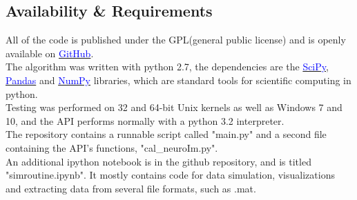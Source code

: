 \documentclass[titlepage]{article}
\begin{document}
\subsection{Availability \& Requirements}
All of the code is published under the GPL(general public license) and is openly available on \href{https://github.com/zmoldir/cal_neuroim}{\textcolor{blue}{GitHub}}\cite{noauthor_gnu_2007}.\\
The algorithm was written with python 2.7, the dependencies are the \href{https://www.scipy.org/}{\textcolor{blue}{SciPy}}\cite{oliphant_python_2007},  \href{http://pandas.pydata.org/}{\textcolor{blue}{Pandas}}\cite{noauthor_pandas:_nodate} and \href{http://www.numpy.org/}{\textcolor{blue}{NumPy}}\cite{walt_numpy_2011} libraries, which are standard tools for scientific computing in python.\\
Testing was performed on 32 and 64-bit Unix kernels as well as Windows 7 and 10, and the API performs normally with a python 3.2 interpreter. \\
The repository contains a runnable script called "main.py" and a second file containing the API's functions, "cal\_neuroIm.py".\\
An additional ipython notebook is in the github repository, and is
titled "simroutine.ipynb". It mostly contains code for data simulation, visualizations and extracting data from several file formats, such as .mat.\\
\end{document}
